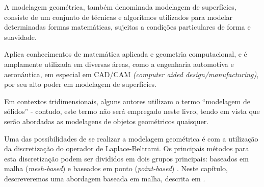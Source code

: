 A modelagem geométrica, também denominada modelagem de superfícies, consiste de um conjunto de técnicas e algoritmos utilizados para modelar determinadas formas matemáticas, sujeitas a condições particulares de forma e suavidade.

Aplica conhecimentos de matemática aplicada e geometria computacional, e é amplamente utilizada em diversas áreas, como a engenharia automotiva e aeronáutica, em especial em CAD/CAM \textit{(computer aided design/manufacturing)}, por seu alto poder em modelagem de superfícies.

Em contextos tridimensionais, alguns autores utilizam o termo ``modelagem de sólidos'' \cite{agoston2005} - contudo, este termo não será empregado neste livro, tendo em vista que serão abordadas as modelagens de objetos geométricos quaisquer. 

Uma das possibilidades de se realizar a modelagem geométrica é com a utilização da discretização do operador de Laplace-Beltrami. Os principais métodos para esta discretização podem ser divididos em dois grupos principais: baseados em malha (\textit{mesh-based}) e baseados em ponto (\textit{point-based}) \cite{petronetto2013}. Neste capítulo, descreveremos uma abordagem baseada em malha, descrita em \cite{sorkine2006}.
